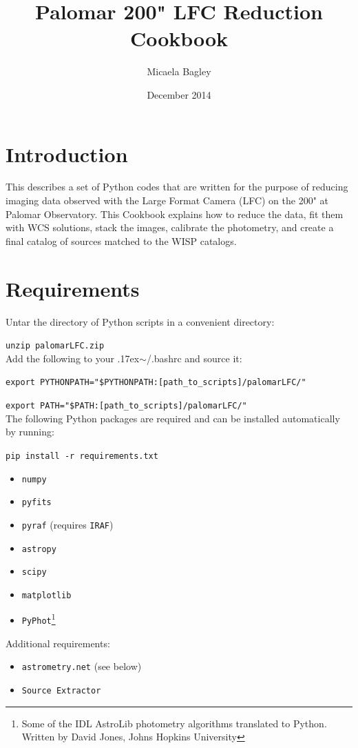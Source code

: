 \documentclass{article}
\title{Palomar 200" LFC Reduction Cookbook}
\author{Micaela Bagley}
\date{December 2014}
\newlength{\wideitemsep}
\let\olditem\item
\renewcommand{\item}{\setlength{\itemsep}{\wideitemsep}\olditem}
\newcommand{\ttsim}{\raise.17ex\hbox{$\scriptstyle\mathtt{\sim}$}}
\begin{document}
\maketitle

\section{Introduction}
This describes a set of Python codes that are written for the purpose 
of reducing imaging data observed with the Large Format Camera (LFC) on the 
200" at Palomar Observatory. This Cookbook explains how to reduce the data,
fit them with WCS solutions, stack the images, calibrate the photometry,
and create a final catalog of sources matched to the WISP catalogs.

\vspace{4 mm}
\section{Requirements}
Untar the directory of Python scripts in a convenient directory: 

\texttt{unzip palomarLFC.zip} \\
Add the following to your \ttsim/.bashrc and source it:

\texttt{export PYTHONPATH="\$PYTHONPATH:[path\_to\_scripts]/palomarLFC/"}

\texttt{export PATH="\$PATH:[path\_to\_scripts]/palomarLFC/"}\\

\noindent The following Python packages are required and can be installed 
automatically by running:

\texttt{pip install -r requirements.txt}
\begin{itemize}
\item \texttt{numpy}
\item \texttt{pyfits}
\item \texttt{pyraf} (requires \texttt{IRAF})
\item \texttt{astropy}
\item \texttt{scipy}
\item \texttt{matplotlib}
\item \texttt{PyPhot}\footnote{Some of the IDL AstroLib photometry algorithms translated to Python. Written by David Jones, Johns Hopkins University}
\end{itemize}

\noindent Additional requirements:
\begin{itemize}
\item \texttt{astrometry.net} (see below)
\item \texttt{Source Extractor}
\end{itemize}
\end{document}
